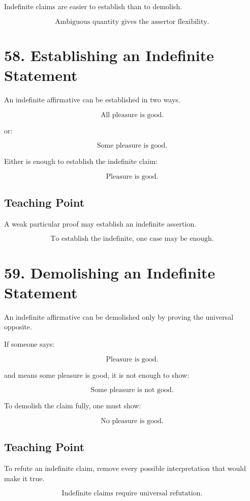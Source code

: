 \documentclass[12pt]{article}
\begin{document}
Indefinite claims are easier to establish than to demolish.

\[
\boxed{
\text{Ambiguous quantity gives the assertor flexibility.}
}
\]

\section*{58. Establishing an Indefinite Statement}

An indefinite affirmative can be established in two ways.

\[
\text{All pleasure is good.}
\]

or:

\[
\text{Some pleasure is good.}
\]

Either is enough to establish the indefinite claim:

\[
\text{Pleasure is good.}
\]

\subsection*{Teaching Point}

A weak particular proof may establish an indefinite assertion.

\[
\boxed{
\text{To establish the indefinite, one case may be enough.}
}
\]

\section*{59. Demolishing an Indefinite Statement}

An indefinite affirmative can be demolished only by proving the universal
opposite.

If someone says:

\[
\text{Pleasure is good.}
\]

and means some pleasure is good, it is not enough to show:

\[
\text{Some pleasure is not good.}
\]

To demolish the claim fully, one must show:

\[
\text{No pleasure is good.}
\]

\subsection*{Teaching Point}

To refute an indefinite claim, remove every possible interpretation that would
make it true.

\[
\boxed{
\text{Indefinite claims require universal refutation.}
}
\]
\end{document}
